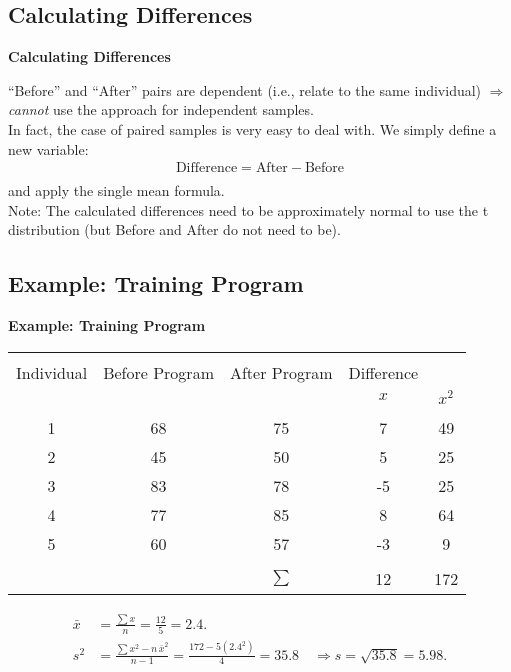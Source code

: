 \documentclass[compress]{beamer}        %
\makeatletter
\newcommand{\tcb}{\textcolor{beamer@blendedblue}}
\makeatother
\begin{document}
\subsection{Calculating Differences}
\begin{frame}{\bf \tcb{Calculating Differences}}

``Before'' and ``After'' pairs are dependent (i.e., relate to the same individual) $\Rightarrow$ \emph{cannot} use the approach for independent samples.\\[1cm]

In fact, the case of paired samples is very easy to deal with. We simply define a new variable:\\[-0.2cm]
\begin{align*}
\boxed{\text{Difference} = \text{After} - \text{Before}}\\[-0.2cm]
\end{align*}
and apply the single mean formula.\\[1cm]

Note: The calculated differences need to be approximately normal to use the t distribution (but Before and After do not need to be).

\end{frame}




\subsection{Example: Training Program}
\begin{frame}{\bf \tcb{Example: Training Program\\[-1cm]}}
\begin{adjustwidth}{-0.1cm}{0cm}
\begin{tabular}{|c|c|c|c|c|}
\hline
&&&&\\[-0.4cm]
Individual & Before Program & After Program & Difference & \phantom{Difference} \\
&& & $x$ & $x^2$\\
\hline
&&&&\\[-0.4cm]
1 & 68 & 75 & \phantom{-}7 & 49 \\
2 & 45 & 50 & \phantom{-}5 & 25 \\
3 & 83 & 78 & -5           & 25 \\
4 & 77 & 85 & \phantom{-}8 & 64 \\
5 & 60 & 57 & -3           & 9 \\[0.1cm]
\hline
\multicolumn{3}{c|}{} && \\[-0.4cm]
\multicolumn{2}{c}{} & $\sum$ & 12           & 172 \\[0.1cm]
\cline{4-5}
\end{tabular}
\end{adjustwidth}
\begin{align*}
\bar x &= \frac{\sum x}{n} = \frac{12}{5} = 2.4. \\[0.6cm]
s^2 &= \frac{\sum x^2 - n \, \bar x^2 }{n-1} = \frac{172 - 5(2.4^2)}{4} = 35.8 \quad \Rightarrow s = \sqrt{35.8} = 5.98.
\end{align*}
\end{frame}
\end{document}
